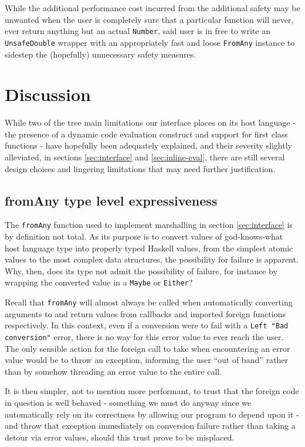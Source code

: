 \documentclass{sigplanconf}
\begin{document}
While the additional performance cost incurred from the additional safety may
be unwanted when the user is completely sure that a particular function
will never, ever return anything but an actual \lstinline!Number!, said user
is in free to write an \lstinline!UnsafeDouble! wrapper with an appropriately
fast and loose \lstinline!FromAny! instance to sidestep the (hopefully)
unnecessary safety measures.

\section{Discussion}\label{sec:discussion}
While two of the tree main limitations our interface places on its host
language - the presence of a dynamic code evaluation construct and support for
first class functions - have hopefully been adequately explained, and their
severity slightly alleviated, in sections \ref{sec:interface} and
\ref{sec:inline-eval}, there are still several design choices and lingering
limitations that may need further justification.

\subsection{fromAny type level expressiveness}
The \lstinline!fromAny! function used to implement marshalling in section
\ref{sec:interface} is by definition not total. As its purpose is to
convert values of god-knows-what host language type into properly typed Haskell
values, from the simplest atomic values to the most complex data structures,
the possibility for failure is apparent. Why, then, does its type not admit
the possibility of failure, for instance by wrapping the converted value in a
\lstinline!Maybe! or \lstinline!Either!?

Recall that \lstinline!fromAny! will almost always be called when
automatically converting arguments to and return values from callbacks and
imported foreign functions respectively. In this context, even if a conversion
were to fail with a \lstinline!Left "Bad conversion"! error, there is no way
for this error value to ever reach the user. The only sensible action for the
foreign call to take when encountering an error value would be to throw an
exception, informing the user ``out of band'' rather than by somehow threading
an error value to the entire call.

It is then simpler, not to mention more performant, to trust that the foreign
code in question is well behaved - something we must do anyway since we
automatically rely on its correctness by allowing our program to depend upon
it - and throw that exception immediately on conversion failure rather than
taking a detour via error values, should this trust prove to be misplaced.
\end{document}
